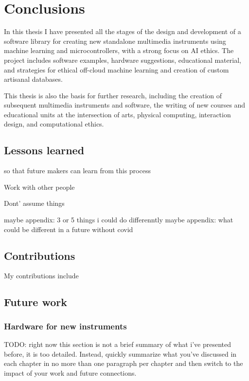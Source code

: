 \chapter{Conclusions}

In this thesis I have presented all the stages of the design and development of a software library for creating new standalone multimedia instruments using machine learning and microcontrollers, with a strong focus on AI ethics. The project includes software examples, hardware suggestions, educational material, and strategies for ethical off-cloud machine learning and creation of custom artisanal databases.

This thesis is also the basis for further research, including the creation of subsequent multimedia instruments and software, the writing of new courses and educational units at the intersection of arts, physical computing, interaction design, and computational ethics.

\section{Lessons learned}

so that future makers can learn from this process

Work with other people

Dont’ assume things

maybe appendix: 3 or 5 things i could do differenntly
maybe appendix: what could be different in a future without covid

\section{Contributions}

My contributions include 

\section{Future work}

\subsection{Hardware for new instruments}

TODO: right now this section is not a brief summary of what i’ve presented before, it is too detailed. Instead, quickly summarize what you've discussed in each chapter in no more than one paragraph per chapter and then switch to the impact of your work and future connections.

